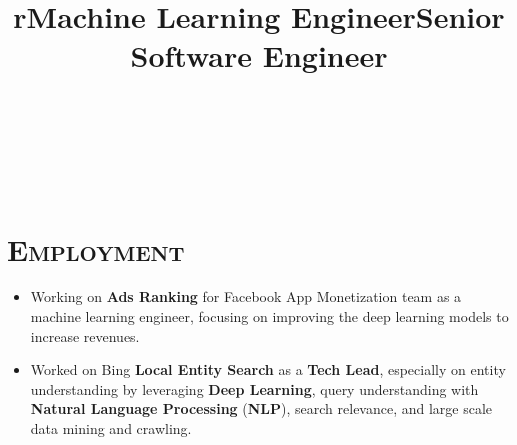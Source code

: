 \begin{resume}

\begin{formatb}
  \title{r}\\
  \\
  \body\\
\end{formatb}

\vspace*{-8pt}
\section{\textsc{Employment}}

\title{Machine Learning Engineer}
\begin{position}
\vspace*{-8pt}
\begin{itemize}
\item Working on \textbf{Ads Ranking} for Facebook App Monetization team as a machine learning engineer, focusing on improving the deep learning models to increase revenues.
\end{itemize} 
\end{position}

\title{Senior Software Engineer}
\begin{position}
\vspace*{-8pt}
\begin{itemize}
\item Worked on Bing \textbf{Local Entity Search} as a \textbf{Tech Lead}, especially on entity understanding by leveraging \textbf{Deep Learning}, query understanding with \textbf{Natural Language Processing} (\textbf{NLP}), search relevance, and large scale data mining and crawling.
\end{itemize} 
\end{position}


\end{resume}
